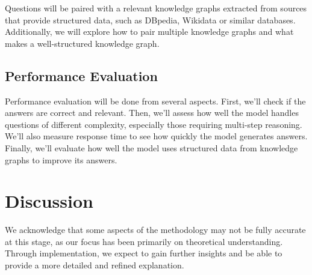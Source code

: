 \documentclass[fleqn,moreauthors,10pt]{ds_report}
\begin{document}
Questions will be paired with a relevant knowledge graphs extracted from sources that provide structured data, such as DBpedia, Wikidata or similar databases. 
Additionally, we will explore how to pair multiple knowledge graphs and what makes a well-structured knowledge graph.



\subsection*{Performance Evaluation}

Performance evaluation will be done from several aspects. First, we’ll check if the answers are correct and relevant. Then, we’ll assess how well the model handles questions of different complexity, especially those requiring multi-step reasoning. We’ll also measure response time to see how quickly the model generates answers. Finally, we’ll evaluate how well the model uses structured data from knowledge graphs to improve its answers.










\section*{Discussion}
We acknowledge that some aspects of the methodology may not be fully accurate at this stage, as our focus has been primarily on theoretical understanding. Through implementation, we expect to gain further insights and be able to provide a more detailed and refined explanation.









\end{document}
